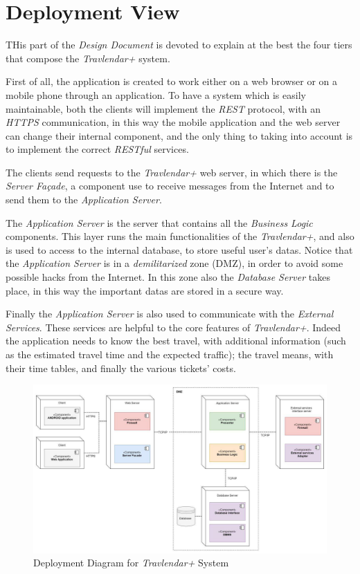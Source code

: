 \section{Deployment View}
THis part of the \emph{Design Document} is devoted to explain at the best the four tiers that compose the \emph{Travlendar+} system.

First of all, the application is created to work either on a web browser or on a mobile phone through an application.
To have a system which is easily maintainable, both the clients will implement the \emph{REST} protocol, with an \emph{HTTPS} communication, in this way the mobile application and the web server can change their internal component, and the only thing to taking into account is to implement the correct \emph{RESTful} services.

The clients send requests to the \emph{Travlendar+} web server, in which there is the \emph{Server Façade}, a component use to receive messages from the Internet and to send them to the \emph{Application Server}.

The \emph{Application Server} is the server that contains all the \emph{Business Logic} components. This layer runs the main functionalities of the \emph{Travlendar+}, and also is used to access to the internal database, to store useful user's datas. Notice that the \emph{Application Server} is in a \emph{demilitarized} zone (DMZ), in order to avoid some possible hacks from the Internet. In this zone also the \emph{Database Server} takes place, in this way the important datas are stored in a secure way.

Finally the \emph{Application Server} is also used to communicate with the \emph{External Services}. These services are helpful to the core features of \emph{Travlendar+}. Indeed the application needs to know the best travel, with additional information (such as the estimated travel time and the expected traffic); the travel means, with their time tables, and finally the various tickets' costs.

\begin{figure}[H]
    \centering
    \includegraphics[scale=0.9]{Pictures/DeploymentPictures/deploymentDiagram.jpg}
    \caption{Deployment Diagram for \emph{Travlendar+} System}
\end{figure}